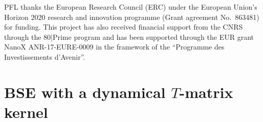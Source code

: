 \documentclass[aip,jcp,reprint,noshowkeys,superscriptaddress]{revtex4-1}
\begin{document}
\begin{acknowledgements}
PFL thanks the European Research Council (ERC) under the European Union's Horizon 2020 research and innovation programme (Grant agreement No.~863481) for funding.
This project has also received financial support from the CNRS through the 80|Prime program and has been supported through the EUR grant NanoX ANR-17-EURE-0009 in the framework of the ``Programme des Investissements d’Avenir''.
\end{acknowledgements}

\onecolumngrid
\appendix
\section{BSE with a dynamical $T$-matrix kernel}
\end{document}
